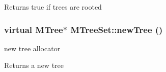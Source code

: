 \begin{DoxyReturn}{Returns}
true if trees are rooted 
\end{DoxyReturn}
\hypertarget{classMTreeSet_a14f065ce54450ea54f3fd8e1cc025103}{
\subsubsection[{newTree}]{\setlength{\rightskip}{0pt plus 5cm}virtual {\bf MTree}$\ast$ MTreeSet::newTree ()}}
\label{classMTreeSet_a14f065ce54450ea54f3fd8e1cc025103}
new tree allocator \begin{DoxyReturn}{Returns}
a new tree 
\end{DoxyReturn}


